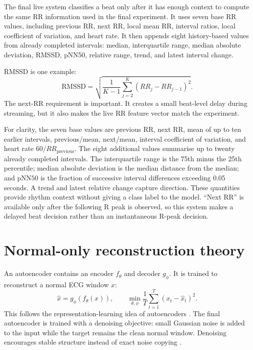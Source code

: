 The final live system classifies a beat only after it has enough context to
compute the same RR information used in the final experiment. It uses seven
base RR values, including previous RR, next RR, local mean RR, interval ratios,
local coefficient of variation, and heart rate. It then appends eight
history-based values from already completed intervals: median, interquartile
range, median absolute deviation, RMSSD, pNN50, relative range, trend, and
latest interval change.

RMSSD is one example:
\begin{equation}
 \mathrm{RMSSD}=\sqrt{\frac{1}{K-1}\sum_{j=2}^{K}(RR_j-RR_{j-1})^2}.
\end{equation}
The next-RR requirement is important. It creates a small beat-level delay during
streaming, but it also makes the live RR feature vector match the experiment.

For clarity, the seven base values are previous RR, next RR, mean of up to ten
earlier intervals, previous/mean, next/mean, interval coefficient of
variation, and heart rate $60/RR_{\mathrm{previous}}$. The eight additional
values summarise up to twenty already completed intervals. The interquartile
range is the 75th minus the 25th percentile; median absolute deviation is
the median distance from the median; and $\mathrm{pNN50}$ is the fraction of
successive interval differences exceeding 0.05 seconds. A trend and latest
relative change capture direction. These quantities provide rhythm context
without giving a class label to the model. ``Next RR'' is available only after
the following R peak is observed, so this system makes a delayed beat decision
rather than an instantaneous R-peak decision.

\section{Normal-only reconstruction theory}

An autoencoder contains an encoder $f_\theta$ and decoder $g_\phi$. It is
trained to reconstruct a normal ECG window $x$:
\begin{equation}
 \hat{x}=g_\phi(f_\theta(x)), \qquad
 \min_{\theta,\phi}\frac{1}{T}\sum_{t=1}^{T}(x_t-\hat{x}_t)^2.
 \label{eq:ae-objective}
\end{equation}
This follows the representation-learning idea of autoencoders
\cite{hinton2006autoencoder}. The final autoencoder is trained with a
denoising objective: small Gaussian noise is added to the input while the
target remains the clean normal window. Denoising encourages stable structure
instead of exact noise copying \cite{vincent2008denoising}.

